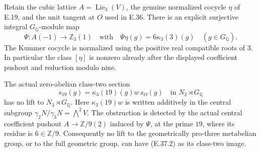 \begin{proposition}
\label{E-integral-detector}
Retain the cubic lattice $A=\operatorname{Lie}_3(V)$,
the genuine normalized cocycle $\eta$ of E.19,
and the unit tangent at $O$ used in E.36.
There is an explicit surjective integral
$G_{\mathbb Q}$-module map
\[
 \Psi:A(-1)\longrightarrow\mathbb Z_3(1)
 \quad\text{with}\quad
 \Psi\eta(g)=6\kappa_3(3)(g)
 \quad(g\in G_{\mathbb Q}).
 \tag{E.37.1}
\]
The Kummer cocycle is normalized using the
positive real compatible roots of $3$.
In particular the class $[\eta]$ is nonzero
already after the displayed coefficient
pushout and reduction modulo nine.

The actual zero-abelian class-two section
\[
 s_{19}(g)=\kappa_3(19)(g)w\,s_O(g)
       \quad\text{in }N_2\rtimes G_{\mathbb Q}
 \tag{E.37.2}
\]
has no lift to $N_3\rtimes G_{\mathbb Q}$.
Here $\kappa_3(19)w$ is written additively
in the central subgroup
$\gamma_2N/\gamma_3N=\bigwedge^2V$.
The obstruction is detected by the actual
central coefficient pushout
$A\to\mathbb Z/9(2)$ induced by $\Psi$,
at the prime $19$, where its residue is
$6\in\mathbb Z/9$. Consequently no lift
to the geometrically pro-three metabelian
group, or to the full geometric group,
can have (E.37.2) as its class-two image.
\end{proposition}
